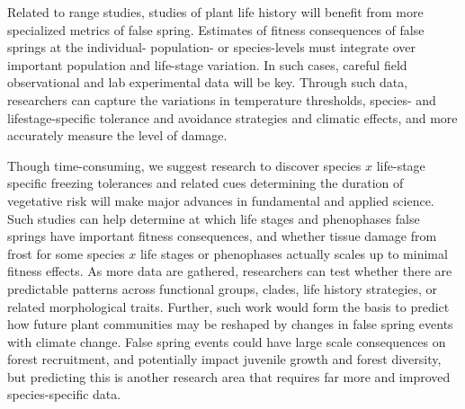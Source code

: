 \documentclass{article}\usepackage[]{graphicx}\usepackage[]{color}
\begin{document}
Related to range studies, studies of plant life history will benefit from more specialized metrics of false spring. Estimates of fitness consequences of false springs at the individual- population- or species-levels must integrate over important population and life-stage variation. In such cases, careful field observational and lab experimental data will be key. Through such data, researchers can capture the variations in temperature thresholds, species- and lifestage-specific tolerance and avoidance strategies and climatic effects, and more accurately measure the level of damage.  

Though time-consuming, we suggest research to discover species \(x\) life-stage specific freezing tolerances and related cues determining the duration of vegetative risk %
will make major advances in fundamental and applied science. Such studies can help determine at which life stages and phenophases false springs have important fitness consequences, and whether tissue damage from frost for some species \(x\) life stages or phenophases actually scales up to minimal fitness effects. As more data are gathered, researchers can test whether there are predictable patterns across functional groups, clades, life history strategies, or related morphological traits. Further, such work would form the basis to predict how future plant communities may be reshaped by changes in false spring events with climate change. False spring events could have large scale consequences on forest recruitment, and potentially impact juvenile growth and forest diversity, but predicting this is another research area that requires far more and improved species-specific data. 
\end{document}
